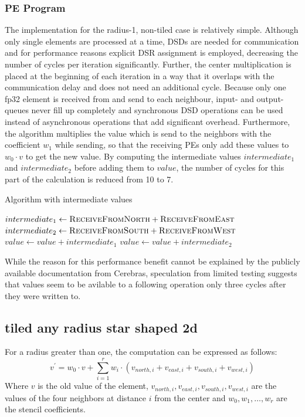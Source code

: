 \documentclass{article}
\begin{document}
\subsubsection{PE Program}
The implementation for the radius-1, non-tiled case is relatively simple.
Although only single elements are processed at a time, DSDs are needed for communication and for performance reasons explicit DSR assignment is employed, decreasing the number of cycles per iteration significantly.  
Further, the center multiplication is placed at the beginning of each iteration in a way that it overlaps with the communication delay and does not need an additional cycle.
Because only one fp32 element is received from and send to each neighbour, input- and output- queues never fill up completely and synchronous DSD operations can be used instead of asynchronous operations that add significant overhead.
Furthermore, the algorithm multiplies the value which is send to the neighbors with the coefficient $w_1$ while sending, so that the receiving PEs only add these values to $w_0 \cdot v$ to get the new value.
By computing the intermediate values $intermediate_1$ and $intermediate_2$ before adding them to $value$, the number of cycles for this part of the calculation is reduced from 10 to 7.
\begin{algorithm}
    \caption{Algorithm with intermediate values}
    \begin{algorithmic}[1]
        \State $intermediate_1 \gets \Call{ReceiveFromNorth}{} + \Call{ReceiveFromEast}{}$
        \State $intermediate_2 \gets \Call{ReceiveFromSouth}{} + \Call{ReceiveFromWest}{}$
        \State $value \gets value +intermediate_1$
        \State $value \gets value +intermediate_2$
    \end{algorithmic}
\end{algorithm}
While the reason for this performance benefit cannot be explained by the publicly available documentation from Cerebras, speculation from limited testing suggests that values seem to be avilable to a following operation only three cycles after they were written to.

\subsection{tiled any radius star shaped 2d}
For a radius greater than one, the computation can be expressed as follows:
\begin{equation}
    \label{eq:stencil_computation_tiled}
    v^' = w_0 \cdot v + \sum_{i=1}^{r} w_i \cdot (v_{north,i} + v_{east,i} + v_{south,i} + v_{west,i})
\end{equation}
Where $v$ is the old value of the element, $v_{north,i}, v_{east,i}, v_{south,i}, v_{west,i}$ are the values of the four neighbors at distance $i$ from the center and $w_0, w_1, \dots, w_r$ are the stencil coefficients.
\end{document}
